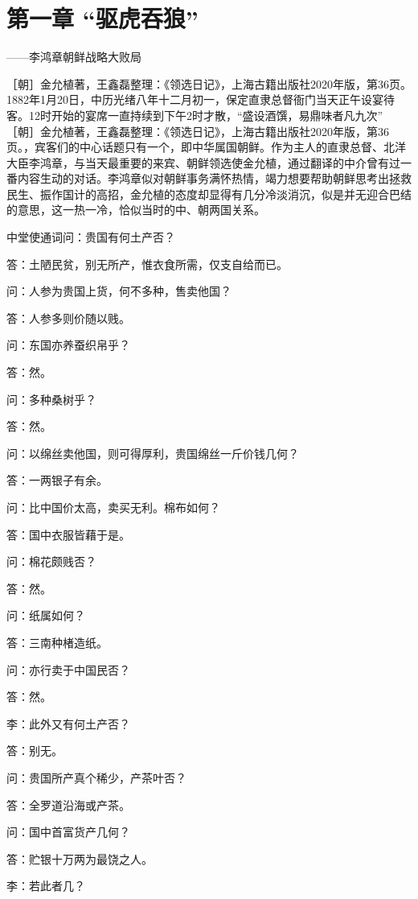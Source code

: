 \documentclass[12pt,UTF8]{ctexbook}
\begin{document}
\mainmatter

\chapter{第一章 “驱虎吞狼”}

——李鸿章朝鲜战略大败局

［朝］金允植著，王鑫磊整理：《领选日记》，上海古籍出版社2020年版，第36页。
1882年1月20日，中历光绪八年十二月初一，保定直隶总督衙门当天正午设宴待客。12时开始的宴席一直持续到下午2时才散，“盛设酒馔，易鼎味者凡九次” ［朝］金允植著，王鑫磊整理：《领选日记》，上海古籍出版社2020年版，第36页。，宾客们的中心话题只有一个，即中华属国朝鲜。作为主人的直隶总督、北洋大臣李鸿章，与当天最重要的来宾、朝鲜领选使金允植，通过翻译的中介曾有过一番内容生动的对话。李鸿章似对朝鲜事务满怀热情，竭力想要帮助朝鲜思考出拯救民生、振作国计的高招，金允植的态度却显得有几分冷淡消沉，似是并无迎合巴结的意思，这一热一冷，恰似当时的中、朝两国关系。

中堂使通词问：贵国有何土产否？

答：土陋民贫，别无所产，惟衣食所需，仅支自给而已。

问：人参为贵国上货，何不多种，售卖他国？

答：人参多则价随以贱。

问：东国亦养蚕织帛乎？

答：然。

问：多种桑树乎？

答：然。

问：以绵丝卖他国，则可得厚利，贵国绵丝一斤价钱几何？

答：一两银子有余。

问：比中国价太高，卖买无利。棉布如何？

答：国中衣服皆藉于是。

问：棉花颇贱否？

答：然。

问：纸属如何？

答：三南种楮造纸。

问：亦行卖于中国民否？

答：然。

李：此外又有何土产否？

答：别无。

问：贵国所产真个稀少，产茶叶否？

答：全罗道沿海或产茶。

问：国中首富货产几何？

答：贮银十万两为最饶之人。

李：若此者几？
\end{document}
